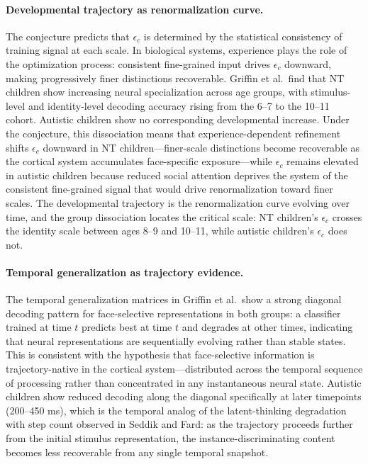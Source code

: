 \documentclass[11pt]{article}
\begin{document}
\paragraph{Developmental trajectory as renormalization curve.}
The conjecture predicts that $\epsilon_c$ is determined by the statistical consistency of
training signal at each scale. In biological systems, experience plays the role of the
optimization process: consistent fine-grained input drives $\epsilon_c$ downward, making
progressively finer distinctions recoverable. Griffin et al.\ find that NT children show
increasing neural specialization across age groups, with stimulus-level and identity-level
decoding accuracy rising from the 6--7 to the 10--11 cohort. Autistic children show no
corresponding developmental increase. Under the conjecture, this dissociation means that
experience-dependent refinement shifts $\epsilon_c$ downward in NT children---finer-scale
distinctions become recoverable as the cortical system accumulates face-specific exposure---while
$\epsilon_c$ remains elevated in autistic children because reduced social attention deprives
the system of the consistent fine-grained signal that would drive renormalization toward finer
scales. The developmental trajectory is the renormalization curve evolving over time, and the
group dissociation locates the critical scale: NT children's $\epsilon_c$ crosses the
identity scale between ages 8--9 and 10--11, while autistic children's $\epsilon_c$ does not.

\paragraph{Temporal generalization as trajectory evidence.}
The temporal generalization matrices in Griffin et al.\ show a strong diagonal decoding
pattern for face-selective representations in both groups: a classifier trained at time $t$
predicts best at time $t$ and degrades at other times, indicating that neural representations
are sequentially evolving rather than stable states. This is consistent with the hypothesis that
face-selective information is trajectory-native in the cortical system---distributed across the
temporal
sequence of processing rather than concentrated in any instantaneous neural state. Autistic
children show reduced decoding along the diagonal specifically at later timepoints (200--450 ms),
which is the temporal analog of the latent-thinking degradation with step count observed in
Seddik and Fard: as the trajectory proceeds further from the initial stimulus representation,
the instance-discriminating content becomes less recoverable from any single temporal snapshot.
\end{document}
